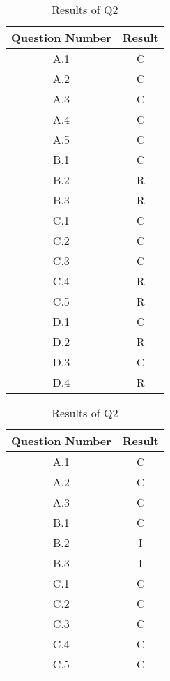 \documentclass[12pt]{article}
\begin{document}
\begin{table}[htbp]
    \centering
    \begin{subtable}{0.3\linewidth}
      \centering
      \begin{tabular}{|c|c|}
          \hline
          Question Number & Result \\
          \hline
          A.1 & C \\
          A.2 & C \\
          A.3 & C \\
          A.4 & C \\
          A.5 & C \\
          B.1 & C \\
          B.2 & R \\
          B.3 & R \\
          C.1 & C \\
          C.2 & C \\
          C.3 & C \\
          C.4 & R \\
          C.5 & R \\
          D.1 & C \\
          D.2 & R \\
          D.3 & C \\
          D.4 & R \\
          \hline
      \end{tabular}
      \caption{Results of Q1}
    \end{subtable}
    \hfill
    \begin{subtable}{0.3\linewidth}
      \centering
      \begin{tabular}{|c|c|}
          \hline
          Question Number & Result \\
          \hline
          A.1 & C \\
          A.2 & C \\
          A.3 & C \\
          B.1 & C \\
          B.2 & I \\
          B.3 & I \\
          C.1 & C \\
          C.2 & C \\
          C.3 & C \\
          C.4 & C \\
          C.5 & C \\
          \hline
      \end{tabular}
      \caption{Results of Q2}

\end{subtable}
\end{table}
\end{document}
